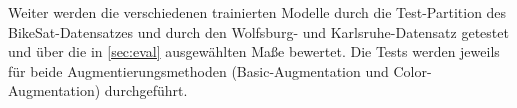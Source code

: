 Weiter werden die verschiedenen trainierten Modelle durch die Test-Partition des BikeSat-Datensatzes und durch den Wolfsburg- und Karlsruhe-Datensatz 
getestet und über die in \autoref{sec:eval} ausgewählten Maße bewertet. Die Tests werden jeweils für beide Augmentierungsmethoden 
(Basic-Augmentation und Color-Augmentation) durchgeführt. 






